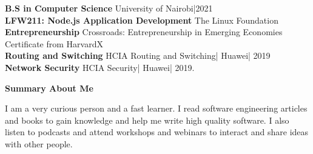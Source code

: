 \documentclass[a4paper]{article}
\begin{document}
\textbf{B.S in Computer Science} University of Nairobi|2021 \\
\textbf{LFW211: Node.js Application Development} The Linux Foundation \\
\textbf{Entrepreneurship} Crossroads: Entrepreneurship in Emerging Economies Certificate from HarvardX \\
\textbf{Routing and Switching} HCIA Routing and Switching| Huawei| 2019 \\
\textbf{Network Security} HCIA Security| Huawei| 2019. \par

\begin{center}
    {\Large \textbf{Summary About Me} }
\end{center}

I am a very curious person and a fast learner. I read software engineering articles and books to gain knowledge and help me write high quality software. I also listen to podcasts and attend workshops and webinars to interact and share ideas with other people.

\end{document}
